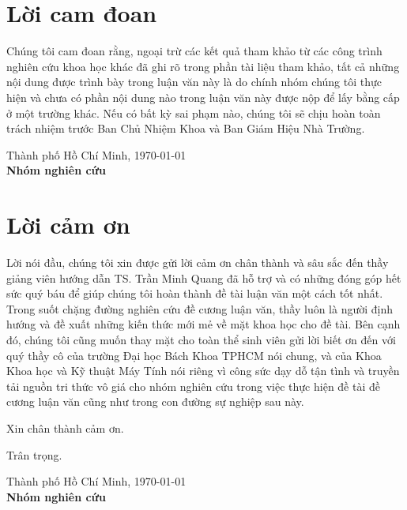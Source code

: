 \documentclass[
11pt, %
english,%
singlespacing, %
parskip, %
headsepline, %
]{MastersDoctoralThesis} %
\begin{document}
\chapter{Lời cam đoan}
Chúng tôi cam đoan rằng, ngoại trừ các kết quả tham khảo từ các công trình nghiên cứu khoa học khác đã ghi rõ trong phần tài liệu tham khảo, tất cả những nội dung được trình bày trong luận văn này là do chính nhóm chúng tôi thực hiện và chưa có phần nội dung nào trong luận văn này được nộp để lấy bằng cấp ở một trường khác. Nếu có bất kỳ sai phạm nào, chúng tôi sẽ chịu hoàn toàn trách nhiệm trước Ban Chủ Nhiệm Khoa và Ban Giám Hiệu Nhà Trường.\\[1cm]

\begin{minipage}[t]{0.4\textwidth}
\hspace*{1cm}
\end{minipage}
\begin{minipage}[t]{0.6\textwidth}
\begin{center}
Thành phố Hồ Chí Minh, \today\\
\textbf{Nhóm nghiên cứu}
\end{center}
\end{minipage}

\chapter{Lời cảm ơn}
Lời nói đầu, chúng tôi xin được gửi lời cảm ơn chân thành và sâu sắc đến thầy giảng viên hướng dẫn TS. Trần Minh Quang đã hỗ trợ và có những đóng góp hết sức quý báu để giúp chúng tôi hoàn thành đề tài luận văn một cách tốt nhất. Trong suốt chặng đường nghiên cứu đề cương luận văn, thầy luôn là người định hướng và đề xuất những kiến thức mới mẻ về mặt khoa học cho đề tài.
Bên cạnh đó, chúng tôi cũng muốn thay mặt cho toàn thể sinh viên gửi lời biết ơn đến với quý thầy cô của trường Đại học Bách Khoa TPHCM nói chung, và của Khoa Khoa học và Kỹ thuật Máy Tính nói riêng vì công sức dạy dỗ tận tình và truyền tải nguồn tri thức vô giá cho nhóm nghiên cứu trong việc thực hiện đề tài đề cương luận văn cũng như trong con đường sự nghiệp sau này.

Xin chân thành cảm ơn.

Trân trọng.\\[1cm]

\begin{minipage}[t]{0.4\textwidth}
\hspace*{1cm}
\end{minipage}
\begin{minipage}[t]{0.6\textwidth}
\begin{center}
Thành phố Hồ Chí Minh, \today\\
\textbf{Nhóm nghiên cứu}
\end{center}
\end{minipage}
\end{document}
